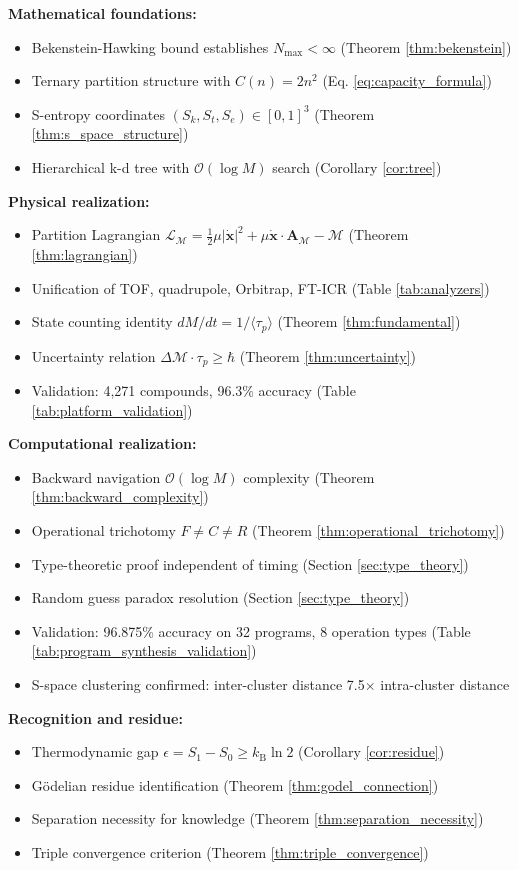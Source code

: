 \documentclass[twocolumn,10pt]{revtex4-2}
\theoremstyle{definition}
\theoremstyle{remark}
\newcommand{\kB}{k_{\mathrm{B}}}
\newcommand{\Sk}{S_k}
\newcommand{\St}{S_t}
\newcommand{\Se}{S_e}
\newcommand{\Nmax}{N_{\max}}
\newcommand{\bigO}{\mathcal{O}}
\newcommand{\Mdepth}{\mathcal{M}}
\newcommand{\Lagr}{\mathcal{L}}
\newcommand{\Apartition}{\mathbf{A}_{\Mdepth}}
\newcommand{\partinert}{\mu}
\newcommand{\taup}{\tau_p}
\begin{document}
\textbf{Mathematical foundations:}
\begin{itemize}
\item Bekenstein-Hawking bound establishes $\Nmax < \infty$ (Theorem \ref{thm:bekenstein})
\item Ternary partition structure with $C(n) = 2n^2$ (Eq. \ref{eq:capacity_formula})
\item S-entropy coordinates $(\Sk, \St, \Se) \in [0,1]^3$ (Theorem \ref{thm:s_space_structure})
\item Hierarchical k-d tree with $\bigO(\log M)$ search (Corollary \ref{cor:tree})
\end{itemize}

\textbf{Physical realization:}
\begin{itemize}
\item Partition Lagrangian $\Lagr_{\Mdepth} = \frac{1}{2}\partinert|\dot{\mathbf{x}}|^2 + \partinert\dot{\mathbf{x}}\cdot\Apartition - \Mdepth$ (Theorem \ref{thm:lagrangian})
\item Unification of TOF, quadrupole, Orbitrap, FT-ICR (Table \ref{tab:analyzers})
\item State counting identity $dM/dt = 1/\langle\taup\rangle$ (Theorem \ref{thm:fundamental})
\item Uncertainty relation $\Delta\Mdepth \cdot \taup \geq \hbar$ (Theorem \ref{thm:uncertainty})
\item Validation: 4,271 compounds, 96.3\% accuracy (Table \ref{tab:platform_validation})
\end{itemize}

\textbf{Computational realization:}
\begin{itemize}
\item Backward navigation $\bigO(\log M)$ complexity (Theorem \ref{thm:backward_complexity})
\item Operational trichotomy $F \neq C \neq R$ (Theorem \ref{thm:operational_trichotomy})
\item Type-theoretic proof independent of timing (Section \ref{sec:type_theory})
\item Random guess paradox resolution (Section \ref{sec:type_theory})
\item Validation: 96.875\% accuracy on 32 programs, 8 operation types (Table \ref{tab:program_synthesis_validation})
\item S-space clustering confirmed: inter-cluster distance 7.5$\times$ intra-cluster distance
\end{itemize}

\textbf{Recognition and residue:}
\begin{itemize}
\item Thermodynamic gap $\epsilon = S_1 - S_0 \geq \kB \ln 2$ (Corollary \ref{cor:residue})
\item Gödelian residue identification (Theorem \ref{thm:godel_connection})
\item Separation necessity for knowledge (Theorem \ref{thm:separation_necessity})
\item Triple convergence criterion (Theorem \ref{thm:triple_convergence})
\end{itemize}
\end{document}
